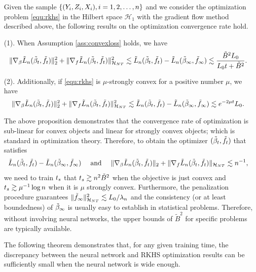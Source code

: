 \begin{proposition}\label{prop:convergence}
Given the sample \( \{(Y_i, Z_i, X_i), i = 1, 2, \dots, n\} \) and we consider the optimization problem \eqref{equ:rkhs} in the Hilbert space $\mathcal{H}_{1}$ with the gradient flow method described above, the following results on the optimization convergence rate hold.

(1). When Assumption \ref{ass:convexloss} holds, we have %
$$
   \| \nabla_{\beta} \tilde{L}_{n} (\tilde{\beta}_{t},\tilde{f}_{t} ) \|_{2}^2 + \| \nabla_{f}\tilde{L}_{n} (\tilde{\beta}_{t},\tilde{f}_{t} )\|_{\mathcal{H}_{NT}}^2 \lesssim \tilde{L}_{n}(\tilde{\beta}_{t}, \tilde{f}_{t} ) - \tilde{L}_{n}(\tilde{\beta}_{\infty}, \tilde{f}_{\infty}) \lesssim \frac{\tilde{B}^2L_{0} }{L_{0} t + \tilde{B}^2}.  
$$

(2). Additionally, if \eqref{equ:rkhs} is $\mu$-strongly convex for a positive number $\mu$, we have %
$$
 \| \nabla_{\beta} \tilde{L}_{n} (\tilde{\beta}_{t},\tilde{f}_{t} ) \|_{2}^2 + \| \nabla_{f}\tilde{L}_{n} (\tilde{\beta}_{t},\tilde{f}_{t} )\|_{\mathcal{H}_{NT}}^2 \lesssim   \tilde{L}_{n}(\tilde{\beta}_{t}, \tilde{f}_{t} ) - \tilde{L}_{n}(\tilde{\beta}_{\infty}, \tilde{f}_{\infty}) \lesssim  e^{- 2\mu t}L_{0}.  
$$
\end{proposition}


\begin{remark}\label{rm:trainingtime}
    The above proposition demonstrates that the convergence rate of optimization is sub-linear for convex objects and linear for strongly convex objects; which is standard in optimization theory. 
    Therefore, to obtain the optimizer $(\tilde{\beta}_{t}, \tilde{f}_{t} )$ that satisfies 
    $$ \tLoss(\tbt, \tft ) - \tLoss(\tbw, \tfw) %
    \quad \text{ and } \quad 
    \|\nabla_{\beta} \tLoss (\tbt,\tft ) \|_{2} + \| \nabla_{\feta}\tLoss (\tbt,\tft)\|_{\rkhs} \lesssim n^{-1}, 
    $$
    we need to train $t_{s}$ that 
    $ t_{s} \gtrsim n^{2} \tilde{B}^{2}$ when the objective is just convex and $  t_{s} \gtrsim \mu^{-1}\log n $ when it is $\mu$ strongly convex. 
    Furthermore, the penalization procedure guarantees $\|  \tilde{f}_{\infty} \|_{\mathcal{H}_{NT}}^2 \lesssim L_{0}/\lambda_n$ and the consistency (or at least boundedness) of $\tilde{\beta}_{\infty}$ is usually easy to establish in statistical problems. 
    Therefore, without involving neural networks, the upper bounds of $\tilde{B}^2$ for specific problems are typically available. 
\end{remark}


The following theorem demonstrates that, for any given training time, the discrepancy between the neural network and RKHS optimization results can be sufficiently small when the neural network is wide enough.



